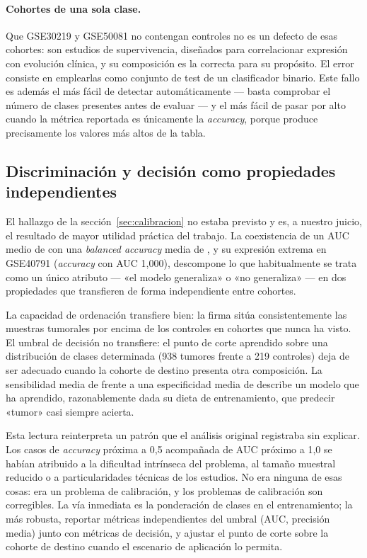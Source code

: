 \paragraph{Cohortes de una sola clase.} Que GSE30219 y GSE50081 no contengan
controles no es un defecto de esas cohortes: son estudios de supervivencia,
diseñados para correlacionar expresión con evolución clínica, y su composición es
la correcta para su propósito. El error consiste en emplearlas como conjunto de
test de un clasificador binario. Este fallo es además el más fácil de detectar
automáticamente --- basta comprobar el número de clases presentes antes de
evaluar --- y el más fácil de pasar por alto cuando la métrica reportada es
únicamente la \emph{accuracy}, porque produce precisamente los valores más altos
de la tabla.

\subsection{Discriminación y decisión como propiedades independientes}
\label{sec:disc-calibracion}

El hallazgo de la sección~\ref{sec:calibracion} no estaba previsto y es, a
nuestro juicio, el resultado de mayor utilidad práctica del trabajo. La
coexistencia de un AUC medio de \aucmedia{} con una \emph{balanced accuracy} media de
\balacc{}, y su expresión extrema en GSE40791 (\emph{accuracy} \acccc{} con AUC 1,000),
descompone lo que habitualmente se trata como un único atributo --- «el modelo
generaliza» o «no generaliza» --- en dos propiedades que transfieren de forma
independiente entre cohortes.

La capacidad de ordenación transfiere bien: la firma sitúa consistentemente las
muestras tumorales por encima de los controles en cohortes que nunca ha visto. El
umbral de decisión no transfiere: el punto de corte aprendido sobre una
distribución de clases determinada (938 tumores frente a 219 controles) deja de
ser adecuado cuando la cohorte de destino presenta otra composición. La
sensibilidad media de \sensmedia{} frente a una especificidad media de \especmedia{} describe un
modelo que ha aprendido, razonablemente dada su dieta de entrenamiento, que
predecir «tumor» casi siempre acierta.

Esta lectura reinterpreta un patrón que el análisis original registraba sin
explicar. Los casos de \emph{accuracy} próxima a 0,5 acompañada de AUC próximo a
1,0 se habían atribuido a la dificultad intrínseca del problema, al tamaño
muestral reducido o a particularidades técnicas de los estudios. No era ninguna
de esas cosas: era un problema de calibración, y los problemas de calibración
son corregibles. La vía inmediata es la ponderación de clases en el
entrenamiento; la más robusta, reportar métricas independientes del umbral (AUC,
precisión media) junto con métricas de decisión, y ajustar el punto de corte
sobre la cohorte de destino cuando el escenario de aplicación lo permita.

